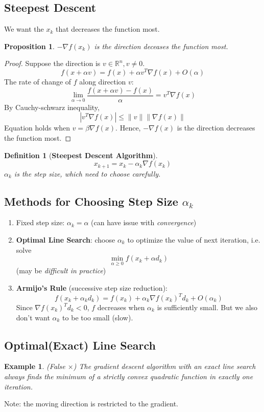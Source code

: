 \documentclass[11pt,a4paper]{article}
\newtheorem{proposition}{Proposition}
\newtheorem{example}{Example}
\newtheorem{definition}{Definition}
\begin{document}
\subsection{Steepest Descent}
We want the $x_k$ that decreases the function most.
\begin{proposition}
$-\nabla f(x_k)$ is the direction deceases the function most.
\end{proposition}
\begin{proof}
Suppose the direction is $v\in \mathbb{R}^n, v\neq 0$.
$$f(x+\alpha v)=f(x)+\alpha v^T \nabla f(x)+O(\alpha)$$
The rate of change of $f$ along direction $v$:
$$\lim_{\alpha \rightarrow 0}\frac{f(x+\alpha v)-f(x)}{\alpha}=v^T\nabla f(x)$$
By Cauchy-schwarz inequality,
$$|v^T\nabla f(x)|\leq \|v\|\|\nabla f(x)\|$$
Equation holds when $v=\beta \nabla f(x)$. Hence, $-\nabla f(x)$ is the direction decreases the function most.
\end{proof}

\begin{definition}[\textbf{Steepest Descent Algorithm}]
$$x_{k+1}=x_k-\alpha_k \nabla f(x_k)$$
$\alpha_k$ is the step size, which need to choose carefully.
\end{definition}

\subsection{Methods for Choosing Step Size $\alpha_k$}
\begin{enumerate}[Method (1):]
    \item Fixed step size: $\alpha_k=\alpha$ (can have issue with \textit{convergence})
    \item \textbf{Optimal Line Search}: choose $\alpha_k$ to optimize the value of next iteration, i.e. solve $$\min_{\alpha\geq 0}f(x_k+\alpha d_k)$$ (may be \textit{difficult in practice})
    \item \textbf{Armijo's Rule} (successive step size reduction):$$f(x_k+\alpha_k d_k)=f(x_k)+\alpha_k \nabla f(x_k)^T d_k+O(\alpha_k)$$
    Since $\nabla f(x_k)^T d_k<0$, $f$ decreases when $\alpha_k$ is sufficiently small. But we also don't want $\alpha_k$ to be too small (slow).
\end{enumerate}

\subsection*{Optimal(Exact) Line Search}
\begin{example}
    (False $\times$) The gradient descent algorithm with an exact line search always finds the minimum of a strictly convex quadratic function in exactly one iteration.
\end{example}
Note: the moving direction is restricted to the gradient.
\end{document}
